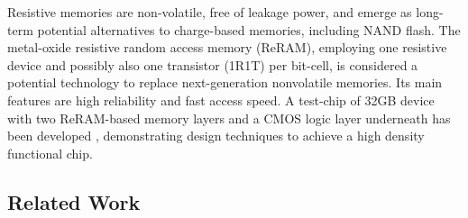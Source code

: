\documentclass{superfri}
\begin{document}
	Resistive memories are non-volatile, free of leakage power, and emerge as long-term potential alternatives to charge-based memories, including NAND flash. The metal-oxide resistive random access memory (ReRAM), employing one resistive device and possibly also one transistor (1R1T) per bit-cell, is considered a potential technology to replace next-generation nonvolatile memories. Its main features are high reliability and fast access speed. A test-chip of 32GB device with two ReRAM-based memory layers and a CMOS logic layer underneath has been developed \cite{liu2014130}, demonstrating design techniques to achieve a high density functional chip. 
	
	\subsection{Related Work}
	\label{sec:related_work}
	
\end{document}
